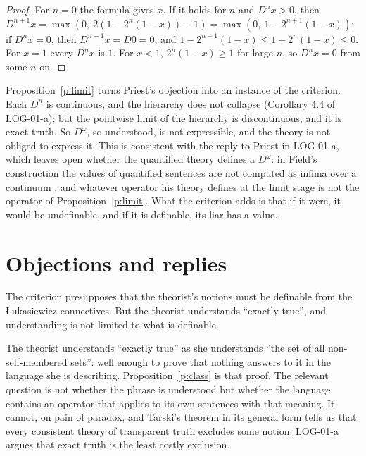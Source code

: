 \documentclass{situationist-preprint}
\begin{document}
\begin{proof}
For $n = 0$ the formula gives $x$. If it holds for $n$ and $D^n x > 0$, then $D^{n+1} x = \max(0,\ 2(1 - 2^n(1-x)) - 1) = \max(0,\ 1 - 2^{n+1}(1-x))$; if $D^n x = 0$, then $D^{n+1} x = D 0 = 0$, and $1 - 2^{n+1}(1 - x) \leq 1 - 2^n(1-x) \leq 0$. For $x = 1$ every $D^n x$ is $1$. For $x < 1$, $2^n(1-x) \geq 1$ for large $n$, so $D^n x = 0$ from some $n$ on.
\end{proof}

Proposition~\ref{p:limit} turns Priest's objection into an instance of the criterion. Each $D^n$ is continuous, and the hierarchy does not collapse (Corollary 4.4 of LOG-01-a); but the pointwise limit of the hierarchy is discontinuous, and it is exact truth. So $D^\omega$, so understood, is not expressible, and the theory is not obliged to express it. This is consistent with the reply to Priest in LOG-01-a, which leaves open whether the quantified theory defines a $D^\omega$: in Field's construction the values of quantified sentences are not computed as infima over a continuum \citep{Field2008}, and whatever operator his theory defines at the limit stage is not the operator of Proposition~\ref{p:limit}. What the criterion adds is that if it were, it would be undefinable, and if it is definable, its liar has a value.

\section{Objections and replies}

\begin{objection}
The criterion presupposes that the theorist's notions must be definable from the Łukasiewicz connectives. But the theorist understands \enquote{exactly true}, and understanding is not limited to what is definable.
\end{objection}

\begin{reply}
The theorist understands \enquote{exactly true} as she understands \enquote{the set of all non-self-membered sets}: well enough to prove that nothing answers to it in the language she is describing. Proposition~\ref{p:class} is that proof. The relevant question is not whether the phrase is understood but whether the language contains an operator that applies to its own sentences with that meaning. It cannot, on pain of paradox, and Tarski's theorem in its general form tells us that every consistent theory of transparent truth excludes some notion. LOG-01-a argues that exact truth is the least costly exclusion.
\end{reply}
\end{document}
